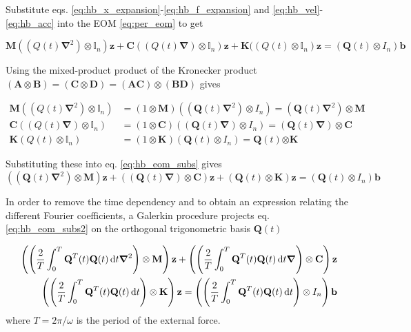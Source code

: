 Substitute eqs. \eqref{eq:hb_x_expansion}-\eqref{eq:hb_f_expansion} and
\eqref{eq:hb_vel}-\eqref{eq:hb_acc} into the EOM \eqref{eq:per_eom} to get

\begin{equation}
  \label{eq:hb_eom_subs}
  \bm M((Q(t)\bm\nabla^2) \otimes \mathbb{I}_n)\bm z  +
  \bm C((Q(t)\bm\nabla) \otimes \mathbb{I}_n)\bm z  +
  \bm K((Q(t) \otimes \mathbb{I}_n)\bm z  =
  (\bm Q(t)\otimes I_n) \bm b
\end{equation}

Using the mixed-product product of the Kronecker product $(\bm A \otimes \bm
B)=(\bm C \otimes \bm D) = (\bm A \bm C) \otimes (\bm B \bm D)$ gives


\begin{equation}
  \begin{aligned}
    \bm M((Q(t)\bm\nabla^2) \otimes \mathbb{I}_n) &=
    (1\otimes \bm M) ((\bm Q(t) \bm \nabla^2)\otimes I_n ) =
    (\bm Q(t)\bm \nabla^2)\otimes \bm M \\
    \bm C((Q(t)\bm\nabla) \otimes \mathbb{I}_n) &=
    (1\otimes \bm C) ((\bm Q(t) \bm \nabla)\otimes I_n ) =
    (\bm Q(t)\bm \nabla)\otimes \bm C \\
    \bm K(Q(t) \otimes \mathbb{I}_n) &=
    (1\otimes \bm K) (\bm Q(t) \otimes I_n ) =
    \bm Q(t)\bm \otimes \bm K
  \end{aligned}
\end{equation}

Substituting these into eq. \eqref{eq:hb_eom_subs} gives
\begin{equation}
  ((\bm Q(t)\bm \nabla^2) \otimes \bm M)\bm z +
  ((\bm Q(t)\bm \nabla) \otimes \bm C)\bm z +
  (\bm Q(t) \otimes \bm K)\bm z =
  (\bm Q(t) \otimes I_n) \bm b
  \label{eq:hb_eom_subs2}
\end{equation}

In order to remove the time dependency and to obtain an expression relating the
different Fourier coefficients, a Galerkin procedure projects eq.
\eqref{eq:hb_eom_subs2} on the orthogonal trigonometric basis $\bm Q(t)$

\begin{equation}
  \begin{aligned}
    \left( \left( \frac{2}{T}\int^T_0 \bm Q^T(t) \bm Q(t) \d t \bm \nabla^2
      \right) \otimes \bm M \right) \bm z +
    \left( \left( \frac{2}{T}\int^T_0 \bm Q^T(t) \bm Q(t) \d t \bm \nabla
      \right) \otimes \bm C \right) \bm z \\
    \left( \left( \frac{2}{T}\int^T_0 \bm Q^T(t) \bm Q(t) \d t
      \right) \otimes \bm K \right) \bm z =
    \left( \left( \frac{2}{T}\int^T_0 \bm Q^T(t) \bm Q(t) \d t
      \right) \otimes I_n \right) \bm b
  \end{aligned}
\end{equation}
where $T=2\pi / \omega$ is the period of the external force.

